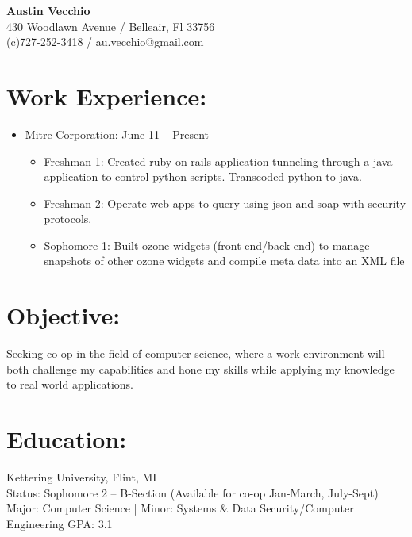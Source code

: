 \documentclass{res}
\begin{document}
\begin{center}
\LARGE{\textbf{Austin Vecchio}}\\
\normalsize{
430 Woodlawn Avenue / Belleair, Fl 33756\\
(c)727-252-3418 / au.vecchio@gmail.com
}
\end{center}

\section{Work Experience:}
\begin{itemize}
\item Mitre Corporation: \hspace{45pt} June 11 – Present
\begin{itemize}[label=$\circ$]
\item Freshman 1: Created ruby on rails application tunneling through a java application to control python scripts. Transcoded python to java.
\item Freshman 2: Operate web apps to query using json and soap with security protocols.
\item Sophomore 1: Built ozone widgets (front-end/back-end) to manage snapshots of other ozone widgets and compile meta data into an XML file
\end{itemize}
\end{itemize}

\section{Objective:}
Seeking co-op in the field of computer science, where a work environment will both challenge my capabilities and hone my skills while applying my knowledge to real world applications.\\

\section{Education:}
Kettering University, Flint, MI\\
Status: Sophomore 2 – B-Section (Available for co-op Jan-March, July-Sept)\\
Major: Computer Science %
|   Minor: Systems \& Data Security/Computer Engineering
GPA: 3.1
\end{document}

